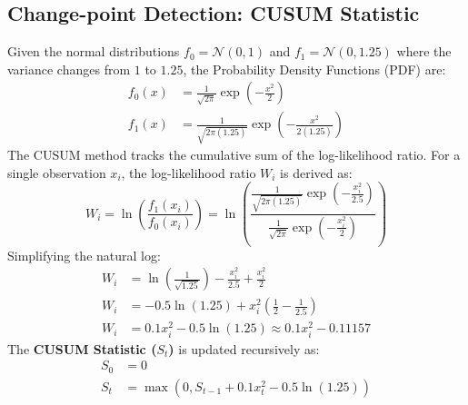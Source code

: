\documentclass[twoside, 10pt]{article}
\begin{document}
\subsection{Change-point Detection: CUSUM Statistic}
Given the normal distributions $f_0 = \mathcal{N}(0, 1)$ and $f_1 = \mathcal{N}(0, 1.25)$ where the variance changes from $1$ to $1.25$, the Probability Density Functions (PDF) are:
\begin{align*}
    f_0(x) &= \frac{1}{\sqrt{2\pi}} \exp\left(-\frac{x^2}{2}\right) \\
    f_1(x) &= \frac{1}{\sqrt{2\pi(1.25)}} \exp\left(-\frac{x^2}{2(1.25)}\right)
\end{align*}
The CUSUM method tracks the cumulative sum of the log-likelihood ratio. For a single observation $x_i$, the log-likelihood ratio $W_i$ is derived as:
\begin{equation*}
    W_i = \ln \left( \frac{f_1(x_i)}{f_0(x_i)} \right) = \ln \left( \frac{\frac{1}{\sqrt{2\pi(1.25)}} \exp\left(-\frac{x_i^2}{2.5}\right)}{\frac{1}{\sqrt{2\pi}} \exp\left(-\frac{x_i^2}{2}\right)} \right)
\end{equation*}
Simplifying the natural log:
\begin{align*}
    W_i &= \ln \left( \frac{1}{\sqrt{1.25}} \right) - \frac{x_i^2}{2.5} + \frac{x_i^2}{2} \\
    W_i &= -0.5 \ln(1.25) + x_i^2 \left(\frac{1}{2} - \frac{1}{2.5}\right) \\
    W_i &= 0.1 x_i^2 - 0.5 \ln(1.25) \approx 0.1 x_i^2 - 0.11157
\end{align*}
The \textbf{CUSUM Statistic ($S_t$)} is updated recursively as:
\begin{align*}
    S_0 &= 0 \\
    S_t &= \max(0, S_{t-1} + 0.1 x_t^2 - 0.5 \ln(1.25))
\end{align*}
\end{document}
